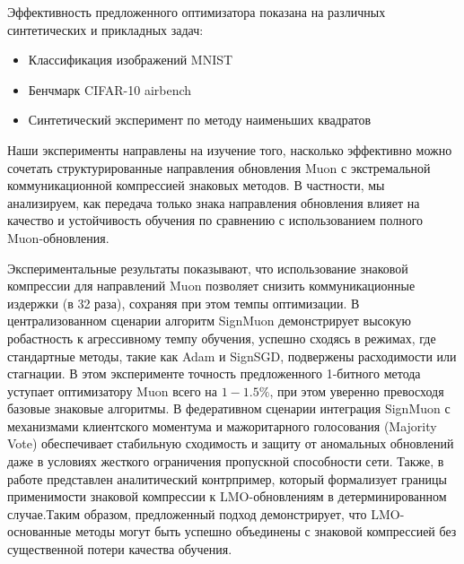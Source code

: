 \documentclass{article}
\begin{document}
Эффективность предложенного оптимизатора показана на различных синтетических и прикладных задач:
\begin{itemize}
    \item Классификация изображений MNIST\cite{lecun2010mnist}
    \item Бенчмарк CIFAR-10 airbench \cite{jordan2023cifar10}
    \item Синтетический эксперимент по методу наименьших квадратов
\end{itemize}

Наши эксперименты направлены на изучение того, насколько эффективно можно сочетать структурированные направления обновления Muon с экстремальной коммуникационной компрессией знаковых методов. В частности, мы анализируем, как передача только знака направления обновления влияет на качество и устойчивость обучения по сравнению с использованием полного Muon-обновления.

Экспериментальные результаты показывают, что использование знаковой компрессии для направлений Muon позволяет снизить коммуникационные издержки (в 32 раза), сохраняя при этом темпы оптимизации. В централизованном сценарии алгоритм SignMuon демонстрирует высокую робастность к агрессивному темпу обучения, успешно сходясь в режимах, где стандартные методы, такие как Adam и SignSGD, подвержены расходимости или стагнации. В этом эксперименте точность предложенного 1-битного метода уступает оптимизатору Muon всего на $1-1.5\%$, при этом уверенно превосходя базовые знаковые алгоритмы. В федеративном сценарии интеграция SignMuon с механизмами клиентского моментума и мажоритарного голосования (Majority Vote) обеспечивает стабильную сходимость и защиту от аномальных обновлений даже в условиях жесткого ограничения пропускной способности сети. Также, в работе представлен аналитический контрпример, который формализует границы применимости знаковой компрессии к LMO-обновлениям в детерминированном случае.Таким образом, предложенный подход демонстрирует, что LMO-основанные методы могут быть успешно объединены с знаковой компрессией без существенной потери качества обучения.

\end{document}
